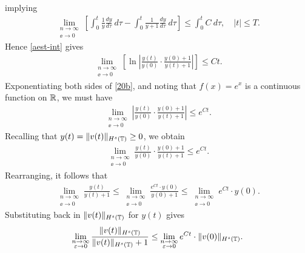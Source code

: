 implying
\begin{equation}
\label{aest-int}
\begin{split}
\lim_{\substack{n \to \infty \\ \ee \to 0} } \left [
\int_0^t \frac{1}{y} \frac{dy}{d \tau} \ d \tau
- \int_0^t \frac{1}{y+1} \frac{dy}{d \tau} \ d \tau \right ]
\le \int_0^t C \ d \tau, \quad |t| \le T.
\end{split}
\end{equation}
Hence \eqref{aest-int} gives 
\begin{equation}
\begin{split}
\lim_{\substack{n \to \infty \\ \ee \to 0} }	\left [ \ln \left | \frac{y(t)}{y(0)}
\cdot \frac{y(0) + 1}{y(t) + 1} \right | \right ] \le C t.
\label{20b}
\end{split}
\end{equation}
Exponentiating both sides of \eqref{20b}, and noting that $f(x) = e^x$
is a continuous function on $\mathbb{R}$, we must have
\begin{equation*}
\begin{split}
\lim_{\substack{n \to \infty \\ \ee \to 0} }	
\left |
\frac{y(t)}{y(0)} \cdot \frac{y(0) + 1}{y(t) + 1} \right | \le e^{C t}.
\end{split}
\end{equation*}
Recalling that $y(t) = \|v(t)\|_{H^s(\mathbb{T})} \ge 0$, we obtain
\begin{equation*}
\begin{split}
\lim_{\substack{n \to \infty \\ \ee \to 0} }	
\frac{y(t)}{y(0)} \cdot \frac{y(0) + 1}{y(t) + 1} \le e^{C t}.
\end{split}
\end{equation*}
Rearranging, it follows that 
\begin{equation*}
\begin{split}
\lim_{\substack{n \to \infty \\ \ee \to 0}} \frac{y(t)}{y(t) + 1}
\le \lim_{\substack{n \to \infty \\ \ee \to 0}} \frac{e^{C t} \cdot y(0)}{y(0) + 1} \le
\lim_{\substack{n \to \infty \\ \ee \to 0}} e^{C t} \cdot y(0).
\end{split}
\end{equation*}
Substituting back in $\|v(t)\|_{H^s(\mathbb{T})}$ for $y(t)$ gives
\begin{equation}
\begin{split}
\lim_{\substack{n \to \infty \\ \varepsilon \to 0}}	\frac{\|v(t)\|_{H^s(\mathbb{T})}}{\|v(t)\|_{H^s(\mathbb{T})} + 1}  \le
\lim_{\substack{n \to \infty \\ \varepsilon \to 0}} e^{C t} \cdot \|v(0)\|_{H^s(\mathbb{T})}.
\label{a303qx}
\end{split}
\end{equation}
